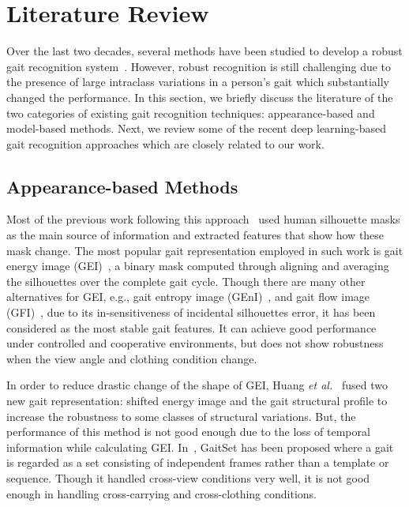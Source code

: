 \chapter{Literature Review} \label{ch:literature_review}
Over the last two decades, several methods have been studied to develop a robust gait recognition system~\cite{Rida_19}. However, robust recognition is still challenging due to the presence of large intraclass variations in a person's gait which substantially changed the performance. In this section, we briefly discuss the literature of the two categories of existing gait recognition techniques: appearance-based and model-based methods. Next, we review some of the recent deep learning-based gait recognition approaches which are closely related to our work. 

\section{Appearance-based Methods}
Most of the previous work following this approach~\cite{Han_06, Bashir_09, Lam_11} used human silhouette masks as the main source of information and extracted features that show how these mask change. The most popular gait representation employed in such work is gait energy image (GEI)~\cite{Han_06}, a binary mask computed through aligning and averaging the silhouettes over the complete gait cycle. Though there are many other alternatives for GEI, e.g., gait entropy image (GEnI)~\cite{Bashir_09}, and gait flow image (GFI)~\cite{Lam_11}, due to its in-sensitiveness of incidental silhouettes error, it has been considered as the most stable gait features.  It can achieve good performance under controlled and cooperative environments, but does not show robustness when the view angle and clothing condition change. 

In order to reduce drastic change of the shape of GEI, Huang \textit{et al.}~\cite{Huang_12} fused two new gait representation: shifted energy image and the gait structural profile to increase the robustness to some classes of structural variations. But, the performance of this method is not good enough due to the loss of temporal information while calculating GEI. In~\cite{Chao_19}, GaitSet has been proposed where a gait is regarded as a set consisting of independent frames rather than a template or sequence. Though it handled cross-view conditions very well, it is not good enough in handling cross-carrying and cross-clothing conditions. 


